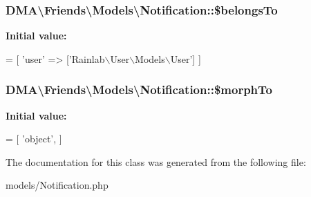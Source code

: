 \subsubsection[{\$belongs\+To}]{\setlength{\rightskip}{0pt plus 5cm}D\+M\+A\textbackslash{}\+Friends\textbackslash{}\+Models\textbackslash{}\+Notification\+::\$belongs\+To}\label{classDMA_1_1Friends_1_1Models_1_1Notification_a7bd3ea8c8431f36da353372d8e42ae44}
{\bfseries Initial value\+:}
\begin{DoxyCode}
= [
        \textcolor{stringliteral}{'user'} => [\textcolor{stringliteral}{'Rainlab\(\backslash\)User\(\backslash\)Models\(\backslash\)User'}]    
    ]
\end{DoxyCode}
\hypertarget{classDMA_1_1Friends_1_1Models_1_1Notification_ac726a50fd0378357be2f744f4c0bfb66}{}
\subsubsection[{\$morph\+To}]{\setlength{\rightskip}{0pt plus 5cm}D\+M\+A\textbackslash{}\+Friends\textbackslash{}\+Models\textbackslash{}\+Notification\+::\$morph\+To}\label{classDMA_1_1Friends_1_1Models_1_1Notification_ac726a50fd0378357be2f744f4c0bfb66}
{\bfseries Initial value\+:}
\begin{DoxyCode}
= [
        \textcolor{stringliteral}{'object'},
    ]
\end{DoxyCode}


The documentation for this class was generated from the following file\+:\begin{DoxyCompactItemize}
\item 
models/Notification.\+php\end{DoxyCompactItemize}
